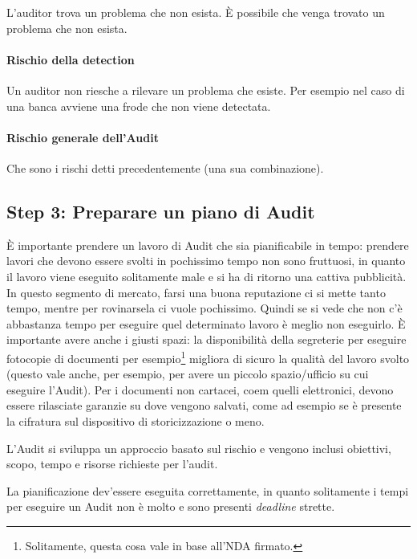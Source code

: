 L'auditor trova un problema che non esista. È possibile che venga trovato un 
problema che non esista.


\paragraph*{Rischio della detection}

Un auditor non riesche a rilevare un problema che esiste. Per esempio nel caso 
di una banca avviene una frode che non viene detectata.


\paragraph*{Rischio generale dell'Audit}

Che sono i rischi detti precedentemente (una sua combinazione).



\subsection{Step 3: Preparare un piano di Audit}

È importante prendere un lavoro di Audit che sia pianificabile in tempo: 
prendere lavori che devono essere svolti in pochissimo tempo non sono 
fruttuosi, in quanto il lavoro viene eseguito solitamente male e si ha di 
ritorno una cattiva pubblicità. In questo segmento di mercato, farsi una buona 
reputazione ci si mette tanto tempo, mentre per rovinarsela ci vuole pochissimo. 
Quindi se si vede che non c'è abbastanza tempo per eseguire quel determinato 
lavoro è meglio non eseguirlo. 
È importante avere anche i giusti spazi: la disponibilità della segreterie per 
eseguire fotocopie di documenti per esempio\footnote{Solitamente, questa cosa 
vale in base all'NDA firmato.} migliora di sicuro la qualità del lavoro svolto 
(questo vale anche, per esempio, per avere un piccolo spazio/ufficio su cui 
eseguire l'Audit). Per i documenti non cartacei, coem quelli elettronici, 
devono essere rilasciate garanzie su dove vengono salvati, come ad esempio se è 
presente la cifratura sul dispositivo di storicizzazione o meno.

L'Audit si sviluppa un approccio basato sul rischio e vengono inclusi 
obiettivi, 
scopo, tempo e risorse richieste per l'audit.

La pianificazione dev'essere eseguita correttamente, in quanto solitamente i 
tempi per eseguire un Audit non è molto e sono presenti \textit{deadline} 
strette.





